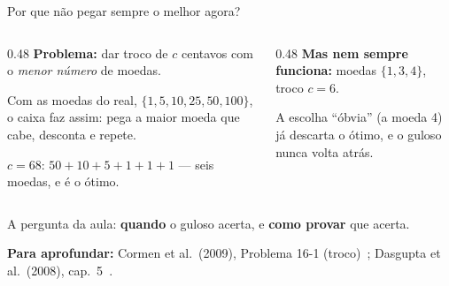 \documentclass[aspectratio=169,xcolor=table]{beamer}
\newcommand{\fonte}[1]{%
  \vfill
  {\tiny\color{gray!55!black}\textbf{Para aprofundar:} #1\par}%
}
\begin{document}
\begin{frame}{Por que não pegar sempre o melhor agora?}
  \begin{columns}[T]
    \begin{column}{0.48\textwidth}
      \textbf{Problema:} dar troco de $c$ centavos com o \emph{menor número} de moedas.
      \medskip

      {\small Com as moedas do real, $\{1, 5, 10, 25, 50, 100\}$, o caixa faz assim: pega a
      maior moeda que cabe, desconta e repete.}
      \medskip

      {\small $c = 68$: $50 + 10 + 5 + 1 + 1 + 1$ --- seis moedas, e é o ótimo.}
    \end{column}
    \begin{column}{0.48\textwidth}
      \textbf{Mas nem sempre funciona:} moedas $\{1, 3, 4\}$, troco $c = 6$.
      \medskip

      \begin{center}
      \end{center}
      {\small A escolha ``óbvia'' (a moeda 4) já descarta o ótimo, e o guloso nunca volta
      atrás.}
    \end{column}
  \end{columns}
  \medskip
  {\small\centering A pergunta da aula: \textbf{quando} o guloso acerta, e \textbf{como provar}
  que acerta.\par}
  \fonte{Cormen et al.\ (2009), Problema 16-1 (troco)~\cite{cormen2009introduction};
    Dasgupta et al.\ (2008), cap.~5~\cite{dasgupta2008algorithms}.}
\end{frame}
\end{document}
